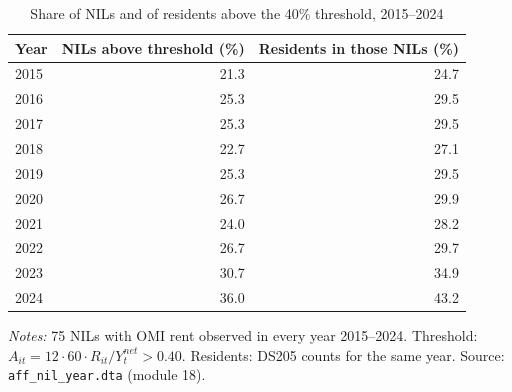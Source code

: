 \begin{table}[htbp]
\centering
\caption{Share of NILs and of residents above the 40\% threshold, 2015--2024}\label{tab:share}
\small
\begin{tabular}{@{}lrr@{}}
\toprule
Year & NILs above threshold (\%) & Residents in those NILs (\%) \\
\midrule
2015 & 21.3 & 24.7 \\
2016 & 25.3 & 29.5 \\
2017 & 25.3 & 29.5 \\
2018 & 22.7 & 27.1 \\
2019 & 25.3 & 29.5 \\
2020 & 26.7 & 29.9 \\
2021 & 24.0 & 28.2 \\
2022 & 26.7 & 29.7 \\
2023 & 30.7 & 34.9 \\
2024 & 36.0 & 43.2 \\
\bottomrule
\end{tabular}

\vspace{4pt}
\begin{minipage}{0.8\linewidth}
\footnotesize\emph{Notes:} 75 NILs with OMI rent observed in every year
2015--2024. Threshold: $A_{it}=12\cdot60\cdot R_{it}/Y^{net}_t>0.40$.
Residents: DS205 counts for the same year. Source: \texttt{aff\_nil\_year.dta}
(module 18).
\end{minipage}
\end{table}

